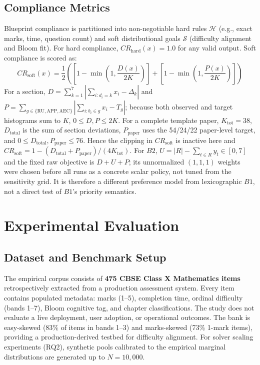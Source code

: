 \documentclass[runningheads]{llncs}
\begin{document}
\subsection{Compliance Metrics}
Blueprint compliance is partitioned into non-negotiable hard rules $\mathcal{H}$ (e.g., exact marks, time, question count) and soft distributional goals $\mathcal{S}$ (difficulty alignment and Bloom fit). For hard compliance, $CR_{\mathrm{hard}}(x) = 1.0$ for any valid output. Soft compliance is scored as:
\begin{equation}
CR_{\mathrm{soft}}(x) = \frac{1}{2} \left( \left[1 - \min\left(1, \frac{D(x)}{2K}\right)\right] + \left[1 - \min\left(1, \frac{P(x)}{2K}\right)\right] \right)
\end{equation}
For a section, $D=\sum_{k=1}^{7}|\sum_{i:d_i=k}x_i-\Delta_k|$ and $P=\sum_{g\in\{\mathrm{RU,APP,AEC}\}}|\sum_{i:b_i\in g}x_i-T_g|$; because both observed and target histograms sum to $K$, $0\leq D,P\leq2K$. For a complete template paper, $K_{\mathrm{tot}}=38$, $D_{\mathrm{total}}$ is the sum of section deviations, $P_{\mathrm{paper}}$ uses the 54/24/22 paper-level target, and $0\leq D_{\mathrm{total}},P_{\mathrm{paper}}\leq76$. Hence the clipping in $CR_{\mathrm{soft}}$ is inactive here and $CR_{\mathrm{soft}}=1-(D_{\mathrm{total}}+P_{\mathrm{paper}})/(4K_{\mathrm{tot}})$. For $B2$, $U=|R|-\sum_{t\in R}y_t\in[0,7]$ and the fixed raw objective is $D+U+P$; its unnormalized $(1,1,1)$ weights were chosen before all runs as a concrete scalar policy, not tuned from the sensitivity grid. It is therefore a different preference model from lexicographic $B1$, not a direct test of $B1$'s priority semantics.

\section{Experimental Evaluation}
\label{sec:experiments}

\subsection{Dataset and Benchmark Setup}
The empirical corpus consists of \textbf{475 CBSE Class X Mathematics items} retrospectively extracted from a production assessment system. Every item contains populated metadata: marks (1--5), completion time, ordinal difficulty (bands 1--7), Bloom cognitive tag, and chapter classifications. The study does not evaluate a live deployment, user adoption, or operational outcomes. The bank is easy-skewed (83\% of items in bands 1--3) and marks-skewed (73\% 1-mark items), providing a production-derived testbed for difficulty alignment. For solver scaling experiments (RQ2), synthetic pools calibrated to the empirical marginal distributions are generated up to $N{=}10{,}000$.
\end{document}
